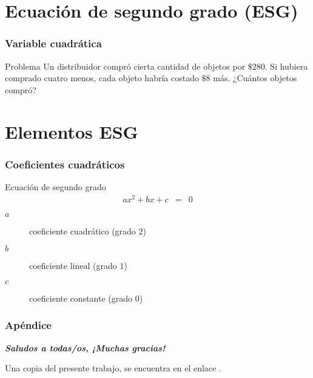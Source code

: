\documentclass[12pt,spanish,x11names]{beamer}
\title{\talktitle}
\subtitle{\talksubtitle}
\author{\talkauthor}
\institute{\talkaffiliation}
\date{\footnotesize{\emph{\href{\talkblog}{\talkemail}}}}
\def\talktitle{Ecuación de Segundo Grado}
\def\talkpubpdf{https://github.com/hsigrist/LMLA/raw/b3ee3cf0a7fda2d4ee27a545bcb482b6cf780d33/3TP/TALKS/ECUACION-SEGUNDO-GRADO-3TP.pdf}
\newcommand{\framedhref}[2]{\href{#1}{\fcolorbox{bluu}{bluu}{\textcolor{white}{#2}}}}
\begin{document}
\begin{frame}
\titlepage
\end{frame}
\section{Ecuación de segundo grado (ESG)}
\begin{frame}
  \frametitle{Variable cuadrática}
  \begin{exampleblock}{Problema}
    Un distribuidor compró cierta cantidad de objetos por $\$280$. Si hubiera
    comprado cuatro menos, cada objeto habría costado $\$8$ más. ¿Cuántos
    objetos compró?
  \end{exampleblock}
\end{frame}
\section{Elementos ESG}
\begin{frame}
  \frametitle{Coeficientes cuadráticos}
  \begin{block}{Ecuación de segundo grado}
    \begin{eqnarray}
      \label{eq:1}
      ax^2+bx+c&=&0
    \end{eqnarray}
    \begin{description}
    \item[$a$] coeficiente cuadrático (grado $2$)
    \item[$b$] coeficiente lineal (grado $1$)
    \item[$c$] coeficiente constante (grado $0$)
    \end{description}
  \end{block}
\end{frame}
\begin{frame}[c]\frametitle{Apéndice}
\centering\decofourleft\quad\decofourright

\textbf{\emph {Saludos a todas/os, ¡Muchas gracias!}}

Una copia del presente trabajo, se encuentra en el enlace \framedhref{\talkpubpdf}{\talktitle}.

\end{frame}
\end{document}
